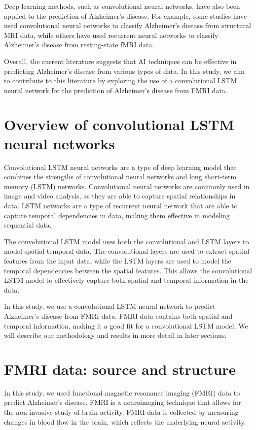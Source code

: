 \documentclass[10pt]{article}
\begin{document}
	Deep learning methods, such as convolutional neural networks, have also been applied to the prediction of Alzheimer's disease. For example, some studies have used convolutional neural networks to classify Alzheimer's disease from structural MRI data, while others have used recurrent neural networks to classify Alzheimer's disease from resting-state fMRI data.

	Overall, the current literature suggests that AI techniques can be effective in predicting Alzheimer's disease from various types of data. In this study, we aim to contribute to this literature by exploring the use of a convolutional LSTM neural network for the prediction of Alzheimer's disease from FMRI data.

	\section{Overview of convolutional LSTM neural networks}

	Convolutional LSTM neural networks are a type of deep learning model that combines the strengths of convolutional neural networks and long short-term memory (LSTM) networks. Convolutional neural networks are commonly used in image and video analysis, as they are able to capture spatial relationships in data. LSTM networks are a type of recurrent neural network that are able to capture temporal dependencies in data, making them effective in modeling sequential data.

	The convolutional LSTM model uses both the convolutional and LSTM layers to model spatial-temporal data. The convolutional layers are used to extract spatial features from the input data, while the LSTM layers are used to model the temporal dependencies between the spatial features. This allows the convolutional LSTM model to effectively capture both spatial and temporal information in the data.

	In this study, we use a convolutional LSTM neural network to predict Alzheimer's disease from FMRI data. FMRI data contains both spatial and temporal information, making it a good fit for a convolutional LSTM model. We will describe our methodology and results in more detail in later sections.

	\section{FMRI data: source and structure}

	In this study, we used functional magnetic resonance imaging (FMRI) data to predict Alzheimer's disease. FMRI is a neuroimaging technique that allows for the non-invasive study of brain activity. FMRI data is collected by measuring changes in blood flow in the brain, which reflects the underlying neural activity.
\end{document}
